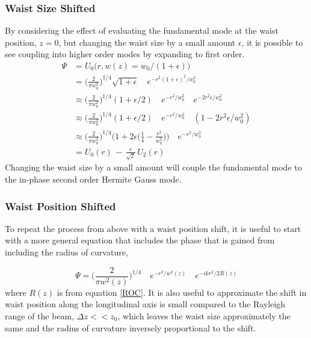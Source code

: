 		
		\subsubsection{Waist Size Shifted}
		By considering the effect of evaluating the fundamental mode at the waist position, $z=0$, but changing the waist size by a small amount $\epsilon$, it is possible to see coupling into higher order modes by expanding to first order.	
		\begin{equation}
		\begin{aligned}
		\Psi 	&=  		U_{0} \big(r,w(z) = w_0/(1+\epsilon) \big) 
		\\		&= 			\bigg( \frac{2}{\pi w_0^2} \bigg)^{1/4} \sqrt{1 + \epsilon} \quad e^{-r^2 (1+\epsilon)^2/w_0^2 }
		\\		&\approx 	\bigg( \frac{2}{\pi w_0^2} \bigg)^{1/4} (1 + \epsilon /2) \quad e^{-r^2/w_0^2} \quad e^{-2r^2\epsilon/w_0^2} 
		\\		&\approx 	\bigg( \frac{2}{\pi w_0^2} \bigg)^{1/4} (1 + \epsilon /2) \quad e^{-r^2/w_0^2} \quad (1-2r^2\epsilon/w_0^2)
		\\		&\approx 	\bigg( \frac{2}{\pi w_0^2} \bigg)^{1/4} \bigg(1+ 2\epsilon\bigg(\frac{1}{4} - \frac{r^2}{w_0^2}\bigg) \bigg ) \quad e^{-r^2/w_0^2}	
		\\		&=			U_0(r) \, - \, \frac{\epsilon}{\sqrt{2}} \, U_2(r)
		\end{aligned}
		\end{equation}
		Changing the waist size by a small amount will couple the fundamental mode to the in-phase second order Hermite Gauss mode.
		
		\subsubsection{Waist Position Shifted}
		To repeat the process from above with a waist position shift, it is useful to start with a more general equation that includes the phase that is gained from including the radius of curvature,
		
		\begin{equation}\label{EFieldwPhase}
		\Psi = 	\bigg( \frac{2}{\pi w^2(z)} \bigg)^{1/4} \quad e^{-r^2/w^2(z)} \quad e^{-ikr^2/2R(z)}
		\end{equation}
		where $R(z)$ is from equation \ref{ROC}.  It is also useful to approximate the shift in waist position along the longitudinal axis is small compared to the Rayleigh range of the beam, $\Delta z << z_0$, which leaves the waist size approximately the same and the radius of curvature inversely proportional to the shift. 
		
